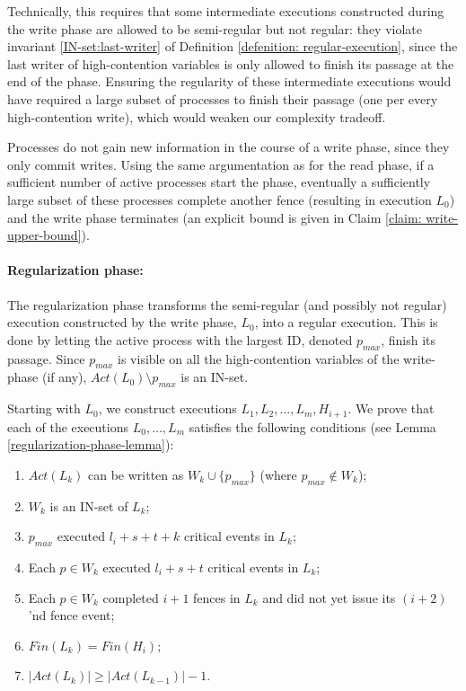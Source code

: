 Technically, this requires that some intermediate executions constructed during the write phase are allowed to be semi-regular but not regular: they violate invariant \ref{IN-set:last-writer} of Definition \ref{defenition: regular-execution}, since the last writer of high-contention variables is only allowed to finish its passage at the end of the phase. Ensuring the regularity of these intermediate executions would have required a large subset of processes to finish their passage (one per every high-contention write), which would weaken our complexity tradeoff.

Processes do not gain new information in the course of a write phase, since they only commit writes. Using the same argumentation as for the read phase, if a sufficient number of active processes start the phase, eventually a sufficiently large subset of these processes complete another fence (resulting in execution $L_0$) and the write phase terminates (an explicit bound is given in Claim
\ref{claim: write-upper-bound}).



\paragraph{Regularization phase:} The regularization phase transforms the semi-regular (and possibly not regular) execution constructed by the write phase, $L_0$, into a regular execution. This is done by letting the active process with the largest ID, denoted $p_{max}$, finish its passage. Since $p_{max}$ is visible on all the high-contention variables of the write-phase (if any), $Act(L_0) \setminus {p_{max}}$ is an IN-set.

Starting with $L_0$, we construct executions $L_1,L_2,\ldots,L_m,H_{i+1}$. We prove that each of the executions $L_0, \ldots, L_m$  satisfies the following conditions (see Lemma \ref{regularization-phase-lemma}):

\begin{enumerate}[(1)]
	\item $Act(L_k)$ can be written as $W_k \cup \{p_{max}\}$ (where $p_{max} \notin W_k$);
	\item $W_k$ is an IN-set of $L_k$;
	\item $p_{max}$ executed $l_i+s+t+k$ critical events in $L_k$;
	\item Each $p \in W_k$ executed $l_i+s+t$ critical events in $L_k$;
	\item Each $p \in W_k$ completed $i+1$ fences in $L_k$ and did not yet issue its $(i+2)$'nd fence event;
	\item $Fin(L_k) = Fin(H_i)$;
	\item $|Act(L_k)| \geq |Act(L_{k-1})|-1$.
\end{enumerate}

